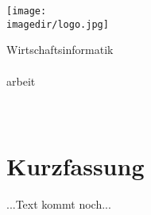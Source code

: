 \thispagestyle{plain}
\begin{minipage}{\textwidth}
        \vspace{-2cm}
        \noindent  \hfill \texttt{[image: \\imagedir/logo.jpg]}
    \end{minipage}
\begin{flushright}
        \footnotesize{Wirtschaftsinformatik}\\
        \medskip
        \small{\textbf{\DerTitelDerArbeit}}\\
        \medskip
        \footnotesize{{\DieArtDerArbeit}arbeit}\\
        \footnotesize{\DerAutorDerArbeit}\\
        \footnotesize{\DerNameDerFirma}\\
\end{flushright}

\section*{Kurzfassung}

...Text kommt noch...
